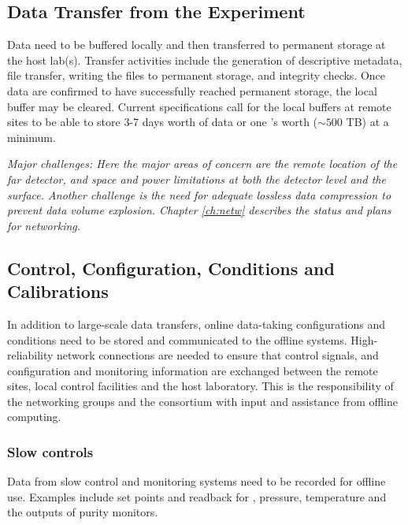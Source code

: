 \documentclass[../main-v1.tex]{subfiles}
\begin{document}
\subsection{Data Transfer from the Experiment}
Data need to be buffered locally and then transferred to permanent storage at the host lab(s).  Transfer activities include the generation of descriptive metadata, file transfer, writing the files to permanent storage, and integrity checks.  Once data are confirmed to have successfully reached permanent storage, the local buffer may be cleared.  Current specifications call for the local buffers at remote sites to be able to store 3-7 days worth of data or one 's worth ($\sim 500$ TB) at a minimum. 

{\it Major challenges: Here the major areas of concern are the remote location of the far detector, and space and power limitations at both the  detector level and the surface. %
Another challenge is the need for adequate lossless data compression to prevent data volume explosion. Chapter \ref{ch:netw} describes the status and plans for networking.}

\subsection{Control, Configuration, Conditions and Calibrations}
In addition to large-scale data transfers, online data-taking configurations and conditions need to be stored and communicated to the offline systems. High-reliability network connections are needed to ensure that control signals, and configuration and monitoring information are exchanged between the remote sites, local control facilities and the host laboratory.
This is the responsibility of the  networking groups and the  consortium with input and assistance from offline computing. 


\subsubsection{Slow controls}
Data from slow control and monitoring systems need to be recorded for offline use.  Examples include set points and readback for , %
pressure, temperature and the outputs of purity monitors. 
\end{document}
